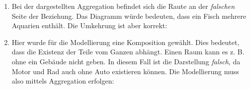 \documentclass{lehramt-informatik-aufgabe}
\begin{document}
\begin{enumerate}
\item \strut


\begin{antwort}
Bei der dargestellten Aggregation befindet sich die Raute an der
\emph{falschen} Seite der Beziehung. Das Diagramm würde bedeuten, dass
ein Fisch mehrere Aquarien enthält. Die Umkehrung ist aber korrekt:

\end{antwort}

\item \strut


\begin{antwort}
Hier wurde für die Modellierung eine Komposition gewählt. Dies bedeutet,
dass die Existenz der Teile vom Ganzen abhängt. Einen Raum kann es z. B.
ohne ein Gebäude nicht geben. In diesem Fall ist die Darstellung
\emph{falsch}, da Motor und Rad auch ohne Auto existieren können. Die
Modellierung muss also mittels Aggregation erfolgen:

\end{antwort}

\end{enumerate}
\end{document}
